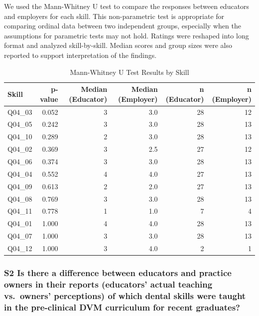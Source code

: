 \documentclass[
  11pt,
  letterpaper,
  DIV=11,
  numbers=noendperiod]{scrartcl}
\numberwithin{figure}{section}
\begin{document}
We used the Mann-Whitney U test to compare the responses between
educators and employers for each skill. This non-parametric test is
appropriate for comparing ordinal data between two independent groups,
especially when the assumptions for parametric tests may not hold.
Ratings were reshaped into long format and analyzed skill-by-skill.
Median scores and group sizes were also reported to support
interpretation of the findings.

\begin{table}
\caption*{
{\large Mann-Whitney U Test Results by Skill}
} 
\fontsize{12.0pt}{14.4pt}\selectfont
\begin{tabular*}{\linewidth}{@{\extracolsep{\fill}}lrrrrr}
\toprule
Skill & p-value & Median (Educator) & Median (Employer) & n (Educator) & n (Employer) \\ 
\midrule\addlinespace[2.5pt]
Q04\_03 & 0.052 & 3 & 3.0 & 28 & 12 \\ 
Q04\_05 & 0.242 & 3 & 3.0 & 28 & 13 \\ 
Q04\_10 & 0.289 & 2 & 3.0 & 28 & 13 \\ 
Q04\_02 & 0.369 & 3 & 2.5 & 27 & 12 \\ 
Q04\_06 & 0.374 & 3 & 3.0 & 28 & 13 \\ 
Q04\_04 & 0.552 & 4 & 4.0 & 27 & 13 \\ 
Q04\_09 & 0.613 & 2 & 2.0 & 27 & 13 \\ 
Q04\_08 & 0.769 & 3 & 3.0 & 28 & 13 \\ 
Q04\_11 & 0.778 & 1 & 1.0 & 7 & 4 \\ 
Q04\_01 & 1.000 & 4 & 4.0 & 28 & 13 \\ 
Q04\_07 & 1.000 & 3 & 3.0 & 28 & 13 \\ 
Q04\_12 & 1.000 & 3 & 4.0 & 2 & 1 \\ 
\bottomrule
\end{tabular*}
\end{table}

\subsubsection{S2 Is there a difference between educators and practice
owners in their reports (educators' actual teaching vs.~owners'
perceptions) of which dental skills were taught in the pre-clinical DVM
curriculum for recent
graduates?}\label{s2-is-there-a-difference-between-educators-and-practice-owners-in-their-reports-educators-actual-teaching-vs.-owners-perceptions-of-which-dental-skills-were-taught-in-the-pre-clinical-dvm-curriculum-for-recent-graduates}
\end{document}
